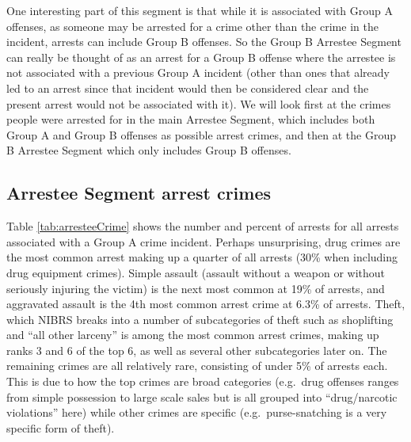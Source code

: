 \documentclass[
]{krantz}
\begin{document}
One interesting part of this segment is that while it is
associated with Group A offenses, as someone may be arrested
for a crime other than the crime in the incident, arrests
can include Group B offenses. So the Group B Arrestee
Segment can really be thought of as an arrest for a Group B
offense where the arrestee is not associated with a previous
Group A incident (other than ones that already led to an
arrest since that incident would then be considered clear
and the present arrest would not be associated with it). We
will look first at the crimes people were arrested for in
the main Arrestee Segment, which includes both Group A and
Group B offenses as possible arrest crimes, and then at the
Group B Arrestee Segment which only includes Group B
offenses.

\subsection{Arrestee Segment arrest
crimes}\label{arrestee-segment-arrest-crimes}

Table \ref{tab:arresteeCrime} shows the number and percent
of arrests for all arrests associated with a Group A crime
incident. Perhaps unsurprising, drug crimes are the most
common arrest making up a quarter of all arrests (30\% when
including drug equipment crimes). Simple assault (assault
without a weapon or without seriously injuring the victim)
is the next most common at 19\% of arrests, and aggravated
assault is the 4th most common arrest crime at 6.3\% of
arrests. Theft, which NIBRS breaks into a number of
subcategories of theft such as shoplifting and ``all other
larceny'' is among the most common arrest crimes, making up
ranks 3 and 6 of the top 6, as well as several other
subcategories later on. The remaining crimes are all
relatively rare, consisting of under 5\% of arrests each.
This is due to how the top crimes are broad categories
(e.g.~drug offenses ranges from simple possession to large
scale sales but is all grouped into ``drug/narcotic
violations'' here) while other crimes are specific
(e.g.~purse-snatching is a very specific form of theft).
\end{document}
